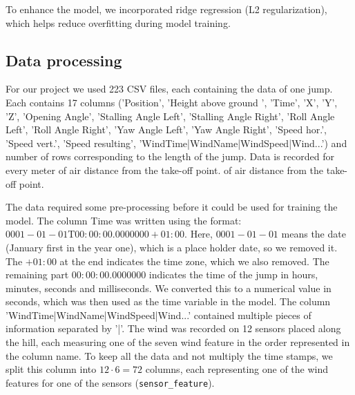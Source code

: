 \documentclass[sigconf,natbib=false, language=english]{acmart}
\begin{document}
To enhance the model, we incorporated ridge regression (L2 regularization), which helps reduce overfitting during model training.

\subsection{Data processing}


For our project we used 223 CSV files, each containing the data of one jump. 
Each contains 17 columns ('Position', 'Height above ground ', 'Time', 'X', 'Y', 'Z', 
'Opening Angle', 'Stalling Angle Left', 'Stalling Angle Right', 
'Roll Angle Left', 'Roll Angle Right', 'Yaw Angle Left', 'Yaw Angle Right', 
'Speed hor.', 'Speed vert.', 'Speed resulting', 
'WindTime|WindName|WindSpeed|Wind...') and number of rows corresponding to the length of the jump. Data is recorded for every meter
of air distance from the take-off point. of air distance from the take-off point.

\bigskip\noindent
The data required some pre-processing before it could be used for training the model.
The column Time was written using the format: $0001-01-01\text{T}00:00:00.0000000+01:00$. Here, 
$0001-01-01$ means the date (January first in the year one), which is a place holder date, so we removed it.
The $+01:00$ at the end indicates the time zone, which we also removed.
The remaining part $00:00:00.0000000$ indicates the time of the jump in hours, minutes, seconds and milliseconds.
We converted this to a numerical value in seconds, which was then used as the time variable in the model.
The column 'WindTime|WindName|WindSpeed|Wind...' contained multiple pieces of information separated by '|'.
The wind was recorded on 12 sensors placed along the hill, each measuring one of the seven wind feature in the order 
represented in the column name. To keep all the data and not multiply the time stamps, we split this 
column into $12 \cdot 6 = 72$ columns, each representing one of the wind features for one of the sensors (\texttt{sensor\_feature}).
\end{document}
